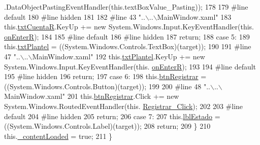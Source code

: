 \begin{DoxyCode}
      .DataObjectPastingEventHandler(\textcolor{keyword}{this}.textBoxValue\_Pasting));
178             
179 \textcolor{preprocessor}{            #line default}
180 \textcolor{preprocessor}{}\textcolor{preprocessor}{            #line hidden}
181 \textcolor{preprocessor}{}            
182 \textcolor{preprocessor}{            #line 43 "..\(\backslash\)..\(\backslash\)MainWindow.xaml"}
183 \textcolor{preprocessor}{}            this.\hyperlink{class_asistencias__wpf_1_1_main_window_a4ce5343faaf6dc02bc33f5da846cd4db}{txtCuentaR}.KeyUp += \textcolor{keyword}{new} System.Windows.Input.KeyEventHandler(this.
      \hyperlink{class_asistencias__wpf_1_1_main_window_a021f286d29f89afb7e646c8a02fdcb4b}{onEnterR});
184             
185 \textcolor{preprocessor}{            #line default}
186 \textcolor{preprocessor}{}\textcolor{preprocessor}{            #line hidden}
187 \textcolor{preprocessor}{}            \textcolor{keywordflow}{return};
188             \textcolor{keywordflow}{case} 5:
189             this.\hyperlink{class_asistencias__wpf_1_1_main_window_a20520a2029311127a68cc320e5a1aed4}{txtPlantel} = ((System.Windows.Controls.TextBox)(target));
190             
191 \textcolor{preprocessor}{            #line 47 "..\(\backslash\)..\(\backslash\)MainWindow.xaml"}
192 \textcolor{preprocessor}{}            this.\hyperlink{class_asistencias__wpf_1_1_main_window_a20520a2029311127a68cc320e5a1aed4}{txtPlantel}.KeyUp += \textcolor{keyword}{new} System.Windows.Input.KeyEventHandler(this.
      \hyperlink{class_asistencias__wpf_1_1_main_window_a021f286d29f89afb7e646c8a02fdcb4b}{onEnterR});
193             
194 \textcolor{preprocessor}{            #line default}
195 \textcolor{preprocessor}{}\textcolor{preprocessor}{            #line hidden}
196 \textcolor{preprocessor}{}            \textcolor{keywordflow}{return};
197             \textcolor{keywordflow}{case} 6:
198             this.\hyperlink{class_asistencias__wpf_1_1_main_window_a37ce519d4dc242993a180c9ec48581f6}{btnRegistrar} = ((System.Windows.Controls.Button)(target));
199             
200 \textcolor{preprocessor}{            #line 48 "..\(\backslash\)..\(\backslash\)MainWindow.xaml"}
201 \textcolor{preprocessor}{}            this.\hyperlink{class_asistencias__wpf_1_1_main_window_a37ce519d4dc242993a180c9ec48581f6}{btnRegistrar}.Click += \textcolor{keyword}{new} System.Windows.RoutedEventHandler(this.
      \hyperlink{class_asistencias__wpf_1_1_main_window_ae4a25f0239f778a1a8ace8d4535c42e5}{Registrar\_Click});
202             
203 \textcolor{preprocessor}{            #line default}
204 \textcolor{preprocessor}{}\textcolor{preprocessor}{            #line hidden}
205 \textcolor{preprocessor}{}            \textcolor{keywordflow}{return};
206             \textcolor{keywordflow}{case} 7:
207             this.\hyperlink{class_asistencias__wpf_1_1_main_window_a225a06fc8dd74f56e03caad3b7eaf6ab}{lblEstado} = ((System.Windows.Controls.Label)(target));
208             \textcolor{keywordflow}{return};
209             \}
210             this.\hyperlink{class_asistencias__wpf_1_1_main_window_ae44c6b71b9c471b3dc9ab07e778e5781}{\_contentLoaded} = \textcolor{keyword}{true};
211         \}
\end{DoxyCode}
